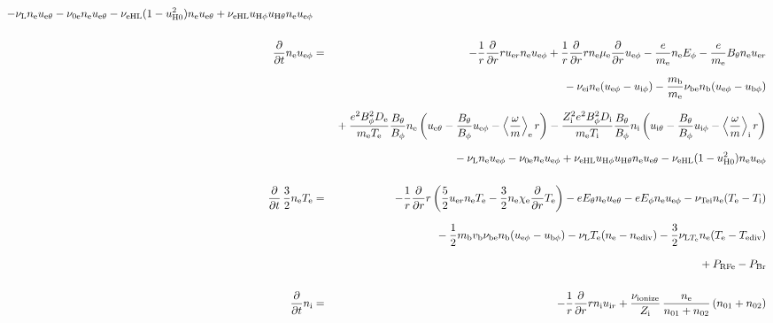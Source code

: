 \documentclass[11pt]{article}
\def\r#1{{\rm#1}}
\def\ddt{\frac{\partial}{\partial t}}
\def\ddr{\frac{\partial}{\partial r}}
\def\ave#1{\left\langle#1\right\rangle}
\def\me{m_\r{e}}
\def\mb{m_\r{b}}
\def\mue{\mu_\r{e}}
\def\mui{\mu_\r{i}}
\def\De{D_\r{e}}
\def\Di{D_\r{i}}
\def\chie{\chi_\r{e}}
\def\ne{n_\r{e}}
\def\ni{n_\r{i}}
\def\nb{n_\r{b}}
\def\uer{u_{\r{e}r}}
\def\uir{u_{\r{i}r}}
\def\ueth{u_{\r{e}\theta}}
\def\uith{u_{\r{i}\theta}}
\def\ueph{u_{\r{e}\phi}}
\def\uiph{u_{\r{i}\phi}}
\def\ubph{u_{\r{b}\phi}}
\def\Eth{E_\theta}
\def\Eph{E_\phi}
\def\Bth{B_\theta}
\def\Bph{B_\phi}
\def\Te{T_\r{e}}
\def\Ti{T_\r{i}}
\def\nna{n_{01}}
\def\nnb{n_{02}}
\def\Zi{Z_\r{i}}
\def\PRFe{P_\r{RFe}}
\def\PBr{P_\r{Br}}
\def\nuei{\nu_\r{ei}}
\def\nube{\nu_\r{be}}
\def\nune{\nu_\r{0e}}
\def\nuL{\nu_\r{L}}
\def\nuion{\nu_\r{ionize}}
\def\nuTei{\nu_\r{Tei}}
\def\vb{v_\r{b}}
\def\nediv{n_\r{ediv}}
\def\Tediv{T_\r{ediv}}
\def\nuLTe{\nu_{\r{L}T_\r{e}}}
\newcommand{\Frac}[2]{%
  {\displaystyle {\displaystyle #1\over \displaystyle #2}}%
}
\newcommand{\rdprd}[2]{\Frac{\partial #1}{\partial #2}}
\newcommand{\aveaveB}[1]{\left< \!\! \left< #1 \right> \!\! \right>}
\begin{document}
\begin{eqnarray}
%
  - \nuL \ne \ueth
%
  - \nune \ne \ueth
%
  - \nu_\r{eHL} (1 - u_\r{H0}^2) \ne \ueth
%
  + \nu_\r{eHL} u_{\r{H}\phi} u_{\r{H}\theta} \ne \ueph
\\[5mm]
%
%
  \ddt \ne \ueph &=&
%
  - \frac{1}{r} \ddr r \uer \ne \ueph
%
  + \frac{1}{r} \ddr r \ne \mue \ddr \ueph
%
  - \frac{e}{\me} \ne \Eph
%
  - \frac{e}{\me} \Bth \ne \uer 
\nonumber\\[2.5mm]&&{}
%
  - \nuei \ne (\ueph - \uiph)
%
  - \frac{\mb}{\me} \nube \nb (\ueph - \ubph)
\nonumber\\[2.5mm]&&{}
%
  + \frac{e^2 \Bph^2 \De}{\me\Te}\frac{\Bth}{\Bph}\ne
    \left(\ueth - \frac{\Bth}{\Bph}\ueph - \ave{\frac{\omega}{m}}_\r{e}
     r \right)
%
  - \frac{\Zi^2 e^2 \Bph^2 \Di}{\me\Ti}\frac{\Bth}{\Bph}\ni
    \left(\uith - \frac{\Bth}{\Bph}\uiph - \ave{\frac{\omega}{m}}_\r{i}
     r \right)
\nonumber\\[2.5mm]&&{}
%
  - \nuL \ne \ueph
%
  - \nune \ne \ueph
%
  + \nu_\r{eHL} u_{\r{H}\phi} u_{\r{H}\theta} \ne \ueth
%
  - \nu_\r{eHL} (1 - u_\r{H0}^2) \ne \ueph
\\[5mm]
%
%
  \ddt \, \frac{3}{2} \ne \Te &=&
%
 - \frac{1}{r} \ddr r
   \left( \frac{5}{2} \uer \ne \Te - \frac{3}{2} \ne \chie \ddr \Te \right)
%
  -  e \Eth \ne \ueth
%
  -  e \Eph \ne \ueph 
%
  - \nuTei \ne (\Te - \Ti)
\nonumber\\[2.5mm]&&{}
%
  - \frac{1}{2} \mb \vb \nube \nb (\ueph - \ubph)
%
  - \nuL \Te (\ne - \nediv)
%
  - \frac{3}{2} \nuLTe \ne (\Te - \Tediv)
\nonumber\\[2.5mm]&&{}
%
  + \PRFe
%
  - \PBr
\\[5mm]
%
%
  \ddt\ni &=&
%
  - \frac{1}{r} \ddr r \ni \uir
%
  + \frac{\nuion}{\Zi}\, \frac{\ne}{\nna+\nnb}\, (\nna+\nnb)

\end{eqnarray}
\end{document}
